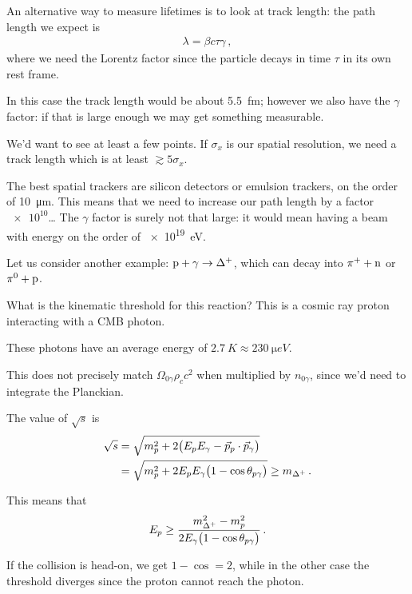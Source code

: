 \documentclass[main.tex]{subfiles}
\begin{document}
An alternative way to measure lifetimes is to look at track length: the path length we expect is 
%
\begin{align}
\lambda = \beta c \tau \gamma 
\,,
\end{align}
%
where we need the Lorentz factor since the particle decays in time \(\tau \) in its own rest frame. 

In this case the track length would be about \SI{5.5}{fm}; however we also have the \(\gamma \) factor: if that is large enough we may get something measurable. 

We'd want to see at least a few points. 
If \(\sigma _x\) is our spatial resolution, we need a track length which is at least \(\gtrsim 5 \sigma _x\). 

The best spatial trackers are silicon detectors or emulsion trackers, on the order of \SI{10}{\micro m}. 
This means that we need to increase our path length by a factor \(\num{e10}\)\dots 
The \(\gamma \) factor is surely not that large: it would mean having a beam with energy on the order of \SI{e19}{eV}.

Let us consider another example: \(\ce{p} + \gamma \to \Delta^{+} \), which can decay into \(\pi^{+} + \ce{n}\) or \(\pi^{0} + \ce{p}\). 

What is the kinematic threshold for this reaction? 
This is a cosmic ray proton interacting with a CMB photon. 

These photons have an average energy of \(\SI{2.7}{K} \approx \SI{230}{\micro eV}\). 

This does not precisely match \(\Omega_{0 \gamma } \rho _c c^2\) when multiplied by \(n_{0 \gamma }\), since we'd need to integrate the Planckian. 

The value of \(\sqrt{s}\) is 
%
\begin{align}
\sqrt{s} &= \sqrt{m_p^2 + 2 \qty(E_p E_\gamma - \vec{p}_p \cdot \vec{p}_\gamma )}  \\
&= \sqrt{m_p^2 + 2 E_p E_\gamma \qty(1 - \cos \theta_{p \gamma })} \geq m_{\Delta^{+}}
\,.
\end{align}

This means that 
%
\begin{align}
E_p \geq \frac{m^2_{\Delta^{+}} - m_p^2}{2 E_\gamma \qty(1 - \cos \theta_{p \gamma })}
\,.
\end{align}

If the collision is head-on, we get \(1 - \cos = 2\), while in the other case the threshold diverges since the proton cannot reach the photon.
\end{document}

